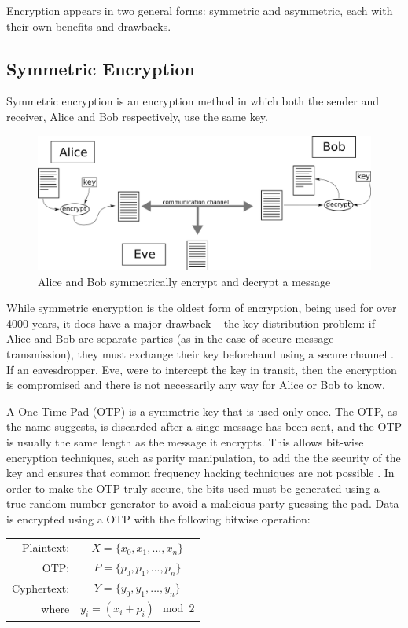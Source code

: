 Encryption appears in two general forms: symmetric and asymmetric, each with their own benefits and drawbacks. 


\subsection{Symmetric Encryption}
Symmetric encryption is an encryption method in which both the sender and receiver, Alice and Bob respectively, use the same key.
\begin{figure}[htp]
\centering
\includegraphics[scale=0.350]{images/symmetric_ecryption.png}
\caption{Alice and Bob symmetrically encrypt and decrypt a message}
\label{}
\end{figure}
While symmetric encryption is the oldest form of encryption, being used for over 4000 years, it does have a major drawback -- the key distribution problem: if Alice and Bob are separate parties (as in the case of secure message transmission), they must exchange their key beforehand using a secure channel \cite{cryptography}.
If an eavesdropper, Eve, were to intercept the key in transit, then the encryption is compromised and there is not necessarily any way for Alice or Bob to know.


A One-Time-Pad (OTP) is a symmetric key that is used only once.
The OTP, as the name suggests, is discarded after a singe message has been sent, and the OTP is usually the same length as the message it encrypts.
This allows bit-wise encryption techniques, such as parity manipulation, to add the the security of the key and ensures that common frequency hacking techniques are not possible \cite{cryptography}.
In order to make the OTP truly secure, the bits used must be generated using a true-random number generator to avoid a malicious party guessing the pad.
Data is encrypted using a OTP with the following bitwise operation:
\begin{center}
\begin{tabular}{rc}
Plaintext: & $X = \{x_0, x_1, ..., x_n\}$ \\
OTP:  & $P = \{p_0, p_1, ..., p_n\}$  \\
Cyphertext:  & $Y = \{y_0, y_1, ..., y_n \}$\\
where  & $y_i = (x_i + p_i) \mod 2 $\\
\end{tabular}
\end{center}

